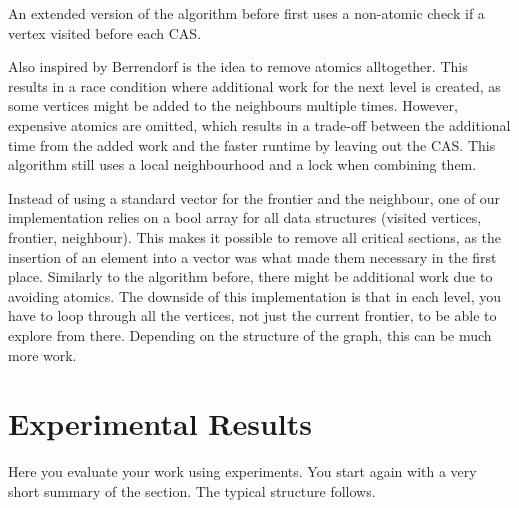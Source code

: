 \documentclass[letterpaper]{article}
\begin{document}
An extended version of the algorithm before first uses a non-atomic check if a vertex visited before each CAS.

Also inspired by Berrendorf \cite{Berrendorf:14} is the idea to remove atomics alltogether. This results in a race condition where additional work for the next level is created, as some vertices might be added to the neighbours multiple times. However, expensive atomics are omitted, which results in a trade-off between the additional time from the added work and the faster runtime by leaving out the CAS. This algorithm still uses a local neighbourhood and a lock when combining them.

Instead of using a standard vector for the frontier and the neighbour, one of our implementation relies on a bool array for all data structures (visited vertices, frontier, neighbour). This makes it possible to remove all critical sections, as the insertion of an element into a vector was what made them necessary in the first place. Similarly to the algorithm before, there might be additional work due to avoiding atomics. The downside of this implementation is that in each level, you have to loop through all the vertices, not just the current frontier, to be able to explore from there. Depending on the structure of the graph, this can be much more work.






\section{Experimental Results}\label{sec:exp}

Here you evaluate your work using experiments. You start again with a
very short summary of the section. The typical structure follows.
\end{document}

